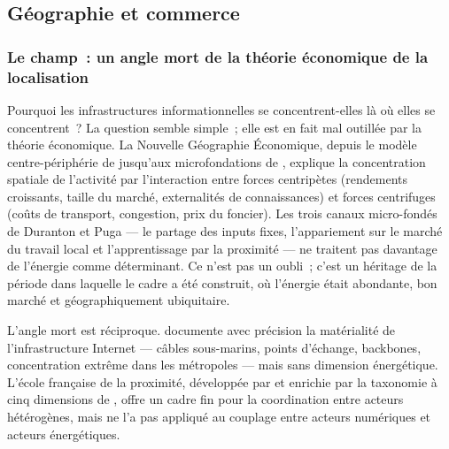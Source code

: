 \clearpage
\subsection{Géographie et commerce}\label{sec:d9-geographie}


\subsubsection{Le champ~: un angle mort de la théorie économique de la localisation}

\markNEO \markSTS
Pourquoi les infrastructures informationnelles se concentrent-elles là où elles se concentrent~? La question semble simple~; elle est en fait mal outillée par la théorie économique. La Nouvelle Géographie Économique, depuis le modèle centre-périphérie de \textcite{krugman_increasing_1991} jusqu'aux microfondations de \textcite{duranton_micro_2004}, explique la concentration spatiale de l'activité par l'interaction entre forces centripètes (rendements croissants, taille du marché, externalités de connaissances) et forces centrifuges (coûts de transport, congestion, prix du foncier).  Les trois canaux micro-fondés de Duranton et Puga --- le partage des inputs fixes, l'appariement sur le marché du travail local et l'apprentissage par la proximité --- ne traitent pas davantage de l'énergie comme déterminant. Ce n'est pas un oubli~; c'est un héritage de la période dans laquelle le cadre a été construit, où l'énergie était abondante, bon marché et géographiquement ubiquitaire.

L'angle mort est réciproque.  \textcite{malecki_economic_2002} documente avec précision la matérialité de l'infrastructure Internet --- câbles sous-marins, points d'échange, backbones, concentration extrême dans les métropoles --- mais sans dimension énergétique. L'école française de la proximité, développée par \textcite{torre_proximity_2005} et enrichie par la taxonomie à cinq dimensions de \textcite{boschma_proximity_2005}, offre un cadre fin pour la coordination entre acteurs hétérogènes, mais ne l'a pas appliqué au couplage entre acteurs numériques et acteurs énergétiques.

